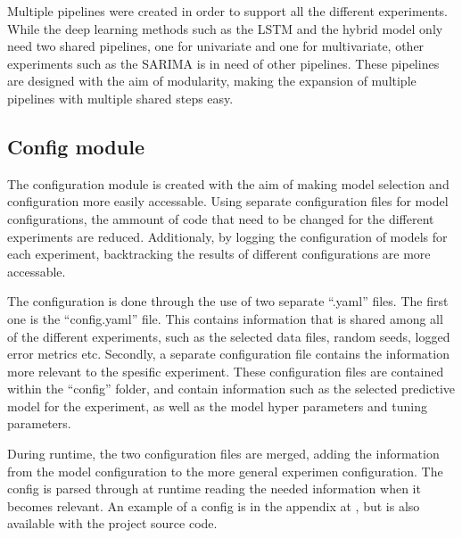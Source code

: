 

Multiple pipelines were created in order to support all the different experiments.
While the deep learning methods such as the LSTM and the hybrid model only need two shared pipelines,
one for univariate and one for multivariate,
other experiments such as the SARIMA is in need of other pipelines.
These pipelines are designed with the aim of modularity,
making the expansion of multiple pipelines with multiple shared steps easy.




\subsection{Config module}
The configuration module is created with the aim of making model selection and configuration more easily accessable.
Using separate configuration files for model configurations,
the ammount of code that need to be changed for the different experiments are reduced.
Additionaly, by logging the configuration of models for each experiment,
backtracking the results of different configurations are more accessable.

The configuration is done through the use of two separate ``.yaml'' files.
The first one is the ``config.yaml'' file.
This contains information that is shared among all of the different experiments,
such as the selected data files, random seeds, logged error metrics etc.
Secondly, a separate configuration file contains the information more relevant to the spesific experiment.
These configuration files are contained within the ``config'' folder,
and contain information such as the selected predictive model for the experiment,
as well as the model hyper parameters and tuning parameters.

During runtime, the two configuration files are merged, adding the information from the model configuration to the more general experimen configuration.
The config is parsed through at runtime reading the needed information when it becomes relevant.
An example of a config is in the appendix at , but is also available with the project source code.


